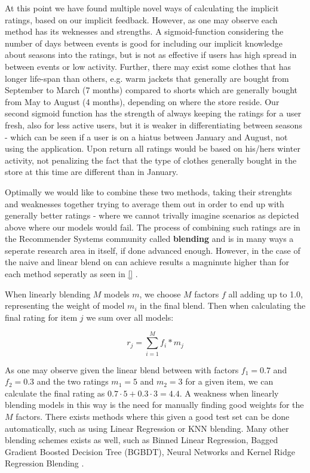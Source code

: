 At this point we have found multiple novel ways of calculating the 
implicit ratings, based on our implicit feedback. However, as one may observe
each method has its weknesses and strengths. A sigmoid-function considering the
number of days between events is good for including our implicit knowledge
about seasons into the ratings, but is not as effective if users has high
spread in between events or low activity. Further, there may exist some clothes
that has longer life-span than others, e.g. warm jackets that generally are
bought from September to March (7 months) compared to shorts which are
generally bought from May to August (4 months), depending on where the store
reside. Our second sigmoid function has the strength of always keeping the
ratings for a user fresh, also for less active users, but it is weaker in
differentiating between seasons - which can be seen if a user is on a hiatus
between January and August, not using the application. Upon return all ratings
would be based on his/hers winter activity, not penalizing the fact that the
type of clothes generally bought in the store at this time are different than
in January.

Optimally we would like to combine these two methods, taking their strenghts
and weaknesses together trying to average them out in order to end up with
generally better ratings - where we cannot trivally imagine scenarios as
depicted above where our models would fail. The process of combining such
ratings are in the Recommender Systems community called \textbf{blending} and
is in many ways a seperate research area in itself, if done advanced enough.
However, in the case of the naive and linear blend on can achieve results a
magninute higher than for each method seperatly as seen in \ref{}
.

When linearly blending $M$ models $m$, we choose $M$ factors $f$ all adding up
to 1.0, representing the weight of model $m_{i}$ in the final blend. Then when
calculating the final rating for item $j$ we sum over all models:

\begin{equation}
  r_j = \sum _{i=1}^{M} f_{i} * m_{j}
\end{equation}

As one may observe given the linear blend between with factors $f_1 = 0.7$ and
$f_2 = 0.3$ and the two ratings $m_1 = 5$ and $m_2 = 3$ for a given item, we
can calculate the final rating as $0.7 \cdot 5 + 0.3 \cdot 3 = 4.4$. A weakness
when linearly blending models in this way is the need for manually finding good
weights for the $M$ factors. There exists methods where this given a good test
set can be done automatically, such as using Linear Regression or KNN blending.
Many other blending schemes exists as well, such as Binned Linear Regression,
Bagged Gradient Boosted Decision Tree (BGBDT), Neural Networks and Kernel Ridge
Regression Blending \cite{jahrer2010combining} \cite{toscher2009bigchaos}.


